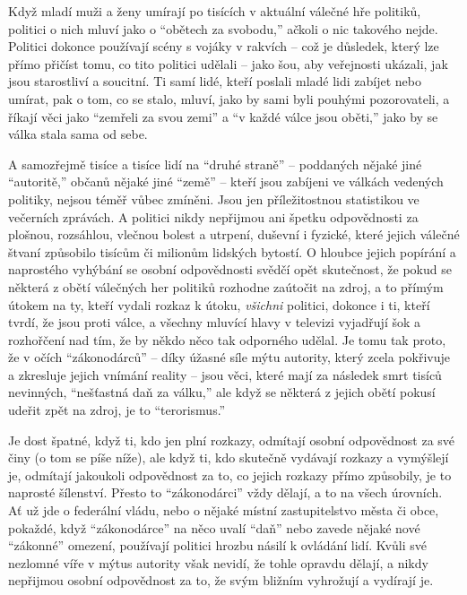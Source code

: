 \documentclass{book}
\begin{document}
Když mladí muži a ženy umírají po tisících v aktuální válečné hře politiků, politici o nich mluví jako o \enquote{obětech za svobodu,} ačkoli o nic takového nejde. Politici dokonce používají scény s vojáky v rakvích -- což je důsledek, který lze přímo přičíst tomu, co tito politici udělali -- jako šou, aby veřejnosti ukázali, jak jsou starostliví a soucitní. Ti samí lidé, kteří poslali mladé lidi zabíjet nebo umírat, pak o tom, co se stalo, mluví, jako by sami byli pouhými pozorovateli, a říkají věci jako \enquote{zemřeli za svou zemi} a \enquote{v každé válce jsou oběti,} jako by se válka stala sama od sebe.

A samozřejmě tisíce a tisíce lidí na \enquote{druhé straně} -- poddaných nějaké jiné \enquote{autoritě,} občanů nějaké jiné \enquote{země} -- kteří jsou zabíjeni ve válkách vedených politiky, nejsou téměř vůbec zmíněni. Jsou jen příležitostnou statistikou ve večerních zprávách. A politici nikdy nepřijmou ani špetku odpovědnosti za plošnou, rozsáhlou, vlečnou bolest a utrpení, duševní i fyzické, které jejich válečné štvaní způsobilo tisícům či milionům lidských bytostí. O hloubce jejich popírání a naprostého vyhýbání se osobní odpovědnosti svědčí opět skutečnost, že pokud se některá z obětí válečných her politiků rozhodne zaútočit na zdroj, a to přímým útokem na ty, kteří vydali rozkaz k útoku, \emph{všichni} politici, dokonce i ti, kteří tvrdí, že jsou proti válce, a všechny mluvící hlavy v televizi vyjadřují šok a rozhořčení nad tím, že by někdo něco tak odporného udělal. Je tomu tak proto, že v očích \enquote{zákonodárců} -- díky úžasné síle mýtu autority, který zcela pokřivuje a zkresluje jejich vnímání reality -- jsou věci, které mají za následek smrt tisíců nevinných, \enquote{nešťastná daň za válku,} ale když se některá z jejich obětí pokusí udeřit zpět na zdroj, je to \enquote{terorismus.}

Je dost špatné, když ti, kdo jen plní rozkazy, odmítají osobní odpovědnost za své činy (o tom se píše níže), ale když ti, kdo skutečně vydávají rozkazy a vymýšlejí je, odmítají jakoukoli odpovědnost za to, co jejich rozkazy přímo způsobily, je to naprosté šílenství. Přesto to \enquote{zákonodárci} vždy dělají, a to na všech úrovních. Ať už jde o federální vládu, nebo o nějaké místní zastupitelstvo města či obce, pokaždé, když \enquote{zákonodárce} na něco uvalí \enquote{daň} nebo zavede nějaké nové \enquote{zákonné} omezení, používají politici hrozbu násilí k ovládání lidí. Kvůli své nezlomné víře v mýtus autority však nevidí, že tohle opravdu dělají, a nikdy nepřijmou osobní odpovědnost za to, že svým bližním vyhrožují a vydírají je.
\end{document}
